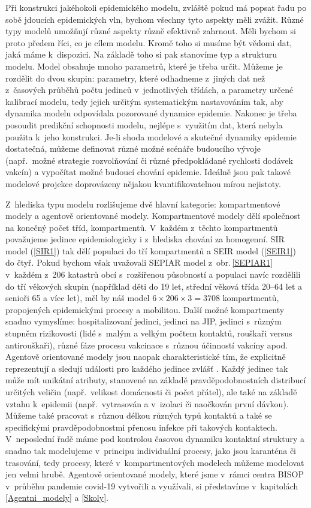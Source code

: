 Při konstrukci jakéhokoli epidemického modelu, zvláště pokud má popsat řadu po sobě jdoucích epidemických vln, bychom všechny tyto aspekty měli zvážit. Různé typy modelů umožňují různé aspekty různě efektivně zahrnout. Měli bychom si proto předem říci, co je cílem modelu. Kromě toho si musíme být vědomi dat, jaká máme k~dispozici. Na základě toho si pak stanovíme typ a strukturu modelu. Model obsahuje mnoho parametrů, které je třeba určit. Můžeme je rozdělit do dvou skupin: parametry, které odhadneme z~jiných dat než z~časových průběhů počtu jedinců v~jednotlivých třídách, a parametry určené kalibrací modelu, tedy jejich určitým systematickým nastavováním tak, aby dynamika modelu odpovídala pozorované dynamice epidemie. Nakonec je třeba posoudit predikční schopnosti modelu, nejlépe s~využitím dat, která nebyla použita k~jeho konstrukci. Je-li shoda modelové a skutečné dynamiky epidemie dostatečná, můžeme definovat různé možné scénáře budoucího vývoje (např.\ možné strategie rozvolňování či různé předpokládané rychlosti dodávek vakcín) a vypočítat možné budoucí chování epidemie. Ideálně jsou pak takové modelové projekce doprovázeny nějakou kvantifikovatelnou mírou nejistoty.

Z~hlediska typu modelu rozlišujeme dvě hlavní kategorie: kompartmentové modely a agentově orientované modely. Kompartmentové modely dělí společnost na konečný počet tříd, kompartmentů. V~každém z~těchto kompartmentů považujeme jedince epidemiologicky i z~hlediska chování za homogenní. SIR model (\ref{SIR1}) tak dělí populaci do tří kompartmentů a SEIR model (\ref{SEIR1}) do čtyř. Pokud bychom však uvažovali SEPIAR model z~obr.\,\ref{SEPIAR1} v~každém z~206 katastrů obcí s~rozšířenou působností a populaci navíc rozdělili do tří věkových skupin (například děti do 19 let, střední věková třída 20--64 let a senioři 65 a více let), měl by náš model $6 \times 206 \times 3 = 3708$ kompartmentů, propojených epidemickými procesy a mobilitou. Další možné kompartmenty snadno vymyslíme: hospitalizovaní jedinci, jedinci na JIP, jedinci s~různým stupněm rizikovosti (lidé s~malým a velkým počtem kontaktů, rouškaři versus antirouškaři), různé fáze procesu vakcinace s~různou účinností vakcíny apod. Agentově orientované modely jsou naopak charakteristické tím, že explicitně reprezentují a sledují události pro každého jedince zvlášť \cite{Smith_etal2018}. Každý jedinec tak může mít unikátní atributy, stanovené na základě pravděpodobnostních distribucí určitých veličin (např.\ velikost domácnosti či počet přátel), ale také na základě vztahu k~epidemii (např.\ vytrasován a v~izolaci či naočkován první dávkou). Můžeme také pracovat s~různou délkou různých typů kontaktů a také se specifickými pravděpodobnostmi přenosu infekce při takových kontaktech. V~neposlední řadě máme pod kontrolou časovou dynamiku kontaktní struktury a snadno tak modelujeme v~principu individuální procesy, jako jsou karanténa či trasování, tedy procesy, které v~kompartmentových modelech můžeme modelovat jen velmi hrubě. Agentově orientované modely, které jsme v~rámci centra BISOP v~průběhu pandemie covid-19 vytvořili a využívali, si představíme v~kapitolách \ref{Agentni_modely} a \ref{Skoly}.  

